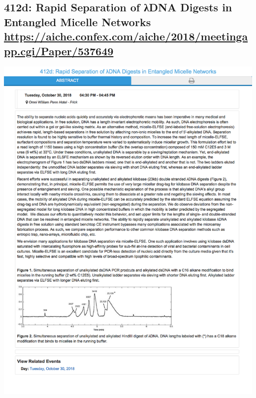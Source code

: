 \documentclass[11pt]{article}
\begin{document}
\subsection{412d:  Rapid Separation of λDNA Digests in Entangled Micelle Networks \url{https://aiche.confex.com/aiche/2018/meetingapp.cgi/Paper/537649}}
\label{sec:org94a4724}
\begin{center}
\includegraphics[width=.9\linewidth]{./537649.png}
\end{center}
\end{document}
